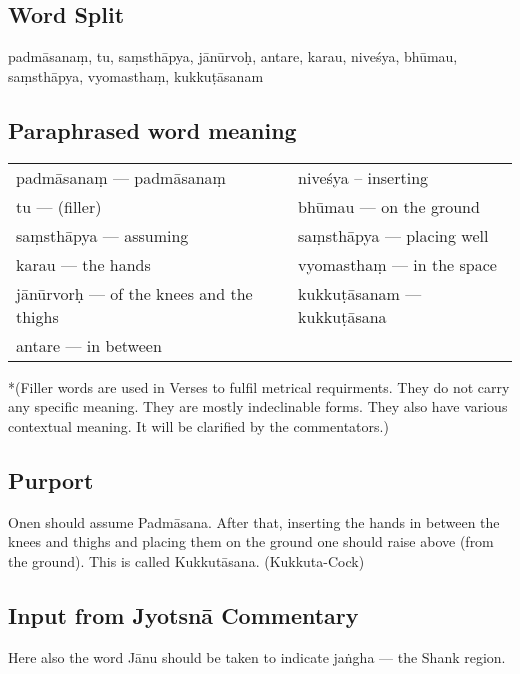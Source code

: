 \subsection*{Word Split}

padmāsanaṃ, tu, saṃsthāpya, jānūrvoḥ, antare, karau, niveśya, bhūmau, saṃsthāpya, vyomasthaṃ, kukkuṭāsanam

\subsection*{Paraphrased word meaning}
\vspace{-10pt}

\begin{longtable}{>{\noindent\raggedright}p{5cm}>{\noindent\raggedright}p{5cm}}
padmāsanaṃ --- padmāsanaṃ & niveśya – inserting\tabularnewline
tu  --- (filler) & bhūmau --- on the ground\tabularnewline
saṃsthāpya --- assuming  & saṃsthāpya --- placing well\tabularnewline
karau --- the hands  & vyomasthaṃ --- in the space\tabularnewline
jānūrvorḥ --- of the knees and the thighs  & kukkuṭāsanam --- kukkuṭāsana \tabularnewline
antare --- in between & 
\end{longtable}
\vspace{-10pt}

*(Filler words are used in Verses to fulfil metrical requirments. They do not carry any specific meaning. They are mostly indeclinable forms. They also have various contextual meaning. It will be clarified by the commentators.)
\vspace{-10pt}

\subsection*{Purport}
\vspace{-10pt}

Onen should assume Padmāsana. After that, inserting the hands in between the knees and thighs and placing them on the ground one should raise above (from the ground). This is called Kukkutāsana. (Kukkuta-Cock)
\vspace{-10pt}

\subsection*{Input from Jyotsnā Commentary}
\vspace{-10pt}

Here also the word Jānu should be taken to indicate jaṅgha --- the Shank region. 

